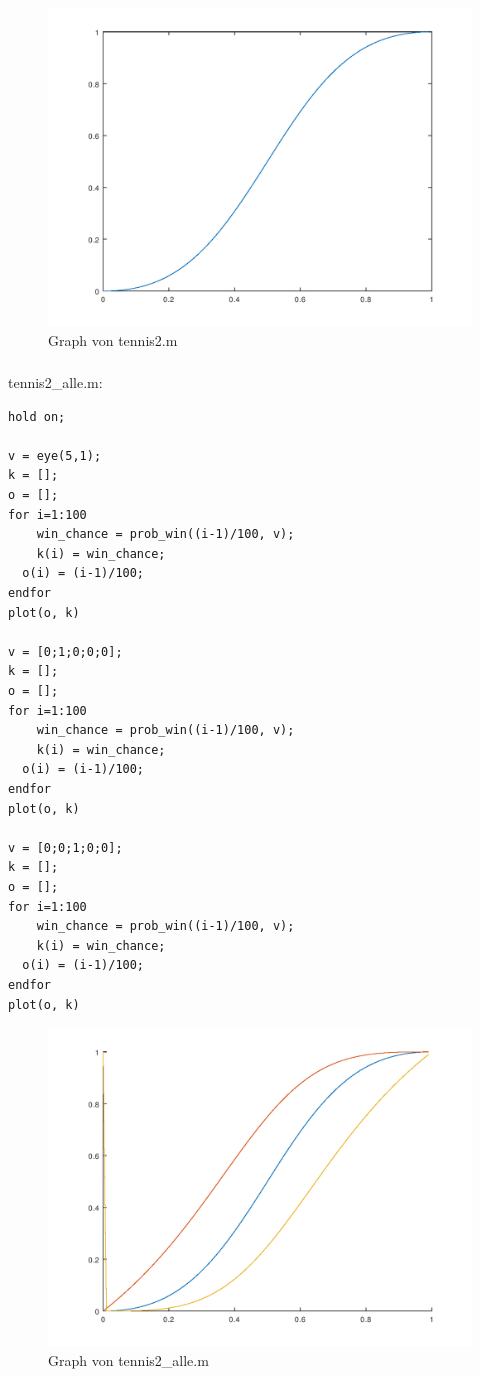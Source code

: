 \documentclass{article}
\begin{document}
\begin{figure}[h!]
\centering
\includegraphics[scale=0.4]{graph.png}
\caption{Graph von tennis2.m}
\label{fig:universe}
\end{figure}

\subsubsection{}
tennis2\_alle.m: \\
\begin{lstlisting}
hold on;

v = eye(5,1);
k = [];
o = [];
for i=1:100
	win_chance = prob_win((i-1)/100, v);
	k(i) = win_chance;
  o(i) = (i-1)/100;
endfor
plot(o, k)

v = [0;1;0;0;0];
k = [];
o = [];
for i=1:100
	win_chance = prob_win((i-1)/100, v);
	k(i) = win_chance;
  o(i) = (i-1)/100;
endfor
plot(o, k)

v = [0;0;1;0;0];
k = [];
o = [];
for i=1:100
	win_chance = prob_win((i-1)/100, v);
	k(i) = win_chance;
  o(i) = (i-1)/100;
endfor
plot(o, k)

\end{lstlisting}

\begin{figure}[h!]
\centering
\includegraphics[scale=0.4]{graph2.png}
\caption{Graph von tennis2\_alle.m}
\label{fig:universe}
\end{figure}
\end{document}

